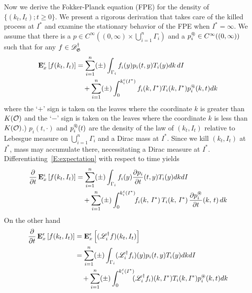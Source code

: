 Now we derive the Fokker-Planck equation (FPE) for the density of $\{(k_t, I_t); t \ge 0\}$. We present a rigorous derivation that takes care of the killed process at $I^*$ and examine the stationary behavior of the FPE when $I^*= \infty$. We assume that there is a $p\in C^\infty((0,\infty)\times \bigcup_{i=1}^n \Gamma_i )$ and a $p_{i}^\circledast\in C^\infty((0,\infty))$ such that for any $f\in \mathscr{D}_\mathfrak G^\dag$
\begin{equation}
\label{E:expectation}
\begin{aligned}
\operatorname{\mathbf E}^\epsilon_x \left[f(k_t, I_t) \right] &= \sum_{i=1}^n (\pm) \int_{\Gamma_i} f_i(y) p_i(t,y) T_i(y) dk\,dI\\
&\quad + \sum_{i=1}^n (\pm) \int_0^{k_i^c(I^*)} f_i(k,I^*) T_{i}(k,I^*) p_{i}^\circledast(k,t) dk
\end{aligned}
\end{equation}
where the `$+$' sign is taken on the leaves where the coordinate $k$ is greater than $K({\mathcal{O}})$ and the `$-$' sign is taken on the leaves where the coordinate $k$ is less than $K({\mathcal{O}})$.) $p_i(t,\cdot)$ and $p_{i}^\circledast(t)$ are the density of the law of $(k_t, I_t)$ relative to Lebesgue measure on $\bigcup_{i=1}^n \Gamma_i$ and a Dirac mass at $I^*$. Since we kill $(k_t, I_t)$ at $I^*$, mass may accumulate there, necessitating a Dirac measure at $I^*$.
Differentiating~\eqref{E:expectation} with respect to time yields
\begin{equation}
\begin{aligned}
\frac{\partial}{\partial t} \operatorname{\mathbf E}^\epsilon_x\left[ f(k_t, I_t) \right] &= \sum_{i=1}^n (\pm) \int_{\Gamma_i} f_{i}(y) \frac{\partial p_{i}}{\partial t}(t,y) T_{i}(y) dk dI\\
&\quad+\sum_{i=1}^n (\pm) \int_0^{k_i^c(I^*)}\!\! f_{i}(k,\,I^*) \, T_{i}(k,\,I^*) \, \frac{\partial p_{i}^\circledast}{\partial t}(k,\,t) \, dk
\end{aligned}
\label{E:exp-prime}
\end{equation}
On the other hand
\begin{equation}
\begin{aligned}
\frac{\partial}{\partial t} \operatorname{\mathbf E}^\epsilon_x\left[f(k_t ,I_t) \right] &= \operatorname{\mathbf E}^\epsilon_x\left[(\mathscr L^\dagger_i f)(k_t, I_t) \right]\\
&= \sum_{i=1}^n (\pm) \int_{\Gamma_i} (\mathscr L^\dagger_i f_{i})(y) p_{i}(t,y) T_{i}(y) dk dI\\
&\quad + \sum_{i=1}^n (\pm) \int_{0}^{k_{i}^{c}(I^*)}\!\! (\mathscr L^\dagger_i f_i)(k,I^*) T_i(k,I^*) p_{i}^\circledast(k,t) dk
\end{aligned}
\label{E:exp-ito}
\end{equation}
